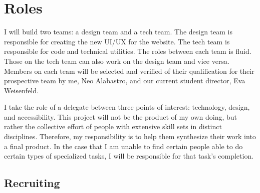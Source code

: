 \section{Roles}
I will build two teams: a design team and a tech team. The design team is responsible for creating the new UI/UX for the website. The tech team is responsible for code and technical utilities. The roles between each team is fluid. Those on the tech team can also work on the design team and vice versa. Members on each team will be selected and verified of their qualification for their prospective team by me, Neo Alabastro, and our current student director, Eva Weisenfeld.

I take the role of a delegate between three points of interest: technology, design, and accessibility. This project will not be the product of my own doing, but rather the collective effort of people with extensive skill sets in distinct disciplines. Therefore, my responsibility is to help them synthesize their work into a final product. In the case that I am unable to find certain people able to do certain types of specialized tasks, I will be responsible for that task's completion.

\subsection{Recruiting}
